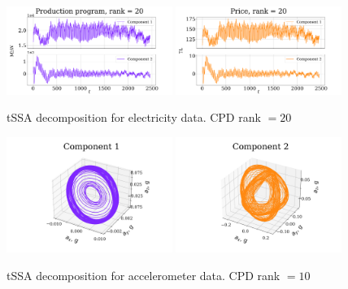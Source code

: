 \documentclass[referee, pdflatex]{sn-jnl}
\theoremstyle{definition}
\theoremstyle{plain}
\begin{document}
	\begin{figure}[h]
		\centering
		\includegraphics[width=0.48\textwidth, keepaspectratio]{../../experiments/electricity/tssa/figs/decomposition/cpd_rank_20/Production program.png}
		\includegraphics[width=0.48\textwidth, keepaspectratio]{../../experiments/electricity/tssa/figs/decomposition/cpd_rank_20/Price.png}
		\caption{tSSA decomposition for electricity data. CPD rank $ = 20 $}\label{fig:electr_decomp_tssa}
	\end{figure}
	
	\begin{figure}[h]
		\centering
		\includegraphics[width=0.48\textwidth, 	keepaspectratio]{../../experiments/motion/tssa/figs/decomposition/cpd_rank_10/acceler_1.png}
		\includegraphics[width=0.48\textwidth, keepaspectratio]{../../experiments/motion/tssa/figs/decomposition/cpd_rank_10/acceler_2.png}
		\caption{tSSA decomposition for accelerometer data. CPD rank $ = 10 $}\label{fig:accel_decomp_tssa}
	\end{figure}
	
\end{document}
